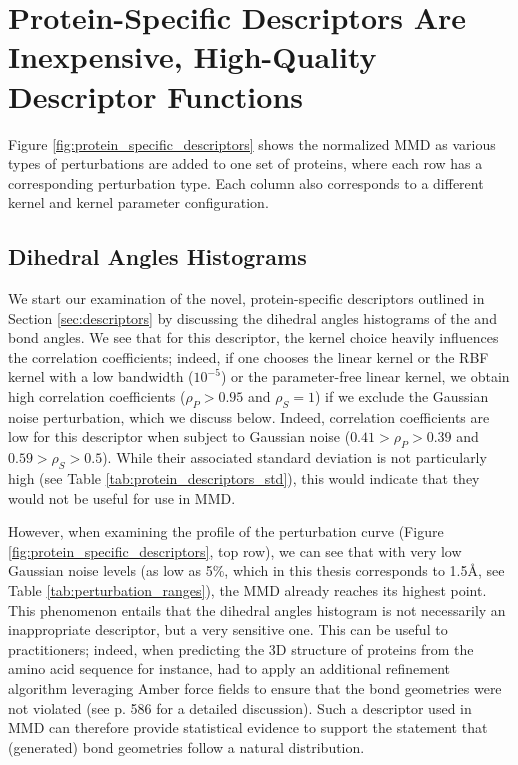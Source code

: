 \section{Protein-Specific Descriptors Are Inexpensive, High-Quality Descriptor
Functions}\label{sec:results_protein_descriptors}

Figure \ref{fig:protein_specific_descriptors} shows the normalized MMD as
various types of perturbations are added to one set of proteins, where each row
has a corresponding perturbation type. Each column also corresponds to a
different kernel and kernel parameter configuration.

\subsection{Dihedral Angles Histograms}\label{sec:res_dihedral_angles}
We start our examination of the novel, protein-specific descriptors outlined in
Section \ref{sec:descriptors} by discussing the dihedral angles histograms of
the \textphi{} and \textpsi{} bond angles. We see that for this descriptor, the
kernel choice heavily influences the correlation coefficients; indeed, if one
chooses the linear kernel or the RBF kernel with a low bandwidth ($10^{-5}$) or
the parameter-free linear kernel, we obtain high correlation coefficients
($\rho_P>0.95$ and $\rho_S=1$) if we exclude the Gaussian noise perturbation,
which we discuss below. Indeed, correlation coefficients are low for this
descriptor when subject to Gaussian noise ($0.41>\rho_P>0.39$ and
$0.59>\rho_S>0.5$). While their associated standard deviation is not
particularly high (see Table \ref{tab:protein_descriptors_std}), this would
indicate that they would not be useful for use in MMD.

However, when examining the profile of the perturbation curve (Figure
\ref{fig:protein_specific_descriptors}, top row), we can see that with very low
Gaussian noise levels (as low as 5\%, which in this thesis corresponds to
1.5\si{\angstrom}, see Table \ref{tab:perturbation_ranges}), the MMD already
reaches its highest point. This phenomenon entails that the dihedral angles
histogram is not necessarily an inappropriate descriptor, but a very sensitive
one. This can be useful to practitioners; indeed, when predicting the 3D
structure of proteins from the amino acid sequence for instance,
\cite{jumper2021highly} had to apply an additional refinement algorithm
leveraging Amber force fields \citep{hornak2006comparison} to ensure that the
bond geometries were not violated (see \citep{jumper2021highly} p. 586 for a
detailed discussion). Such a descriptor used in MMD can therefore provide
statistical evidence to support the statement that (generated) bond geometries
follow a natural distribution.

